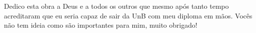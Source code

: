 Dedico esta obra a Deus e a todos os outros que mesmo após tanto tempo acreditaram que eu seria capaz de sair da \acrfull{UnB} com meu diploma em mãos. Vocês não tem ideia como são importantes para mim, muito obrigado!